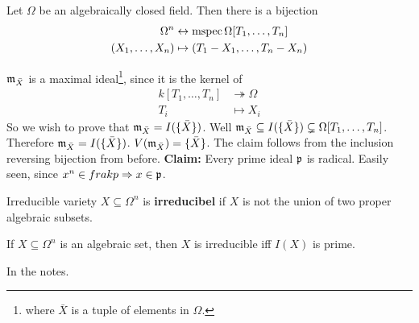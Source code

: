 \documentclass{article}
\begin{document}
\begin{corr}{}
    Let $\Omega$ be an algebraically closed field. Then there is a bijection 
    \begin{align*}
        \Omega^{n} &\leftrightarrow \operatorname{mspec} \Omega[T_{1},\dots,T_{n}]\\
        (X_{1}, \dots, X_{n}) &\mapsto (T_{1}-X_{1}, \dots, T_{n}-X_{n})
    \end{align*}
\end{corr}
\proof $\mathfrak{m}_{\bar X}$ is a maximal ideal\footnote{where $\bar X$ is a tuple of elements in $\Omega$.}, since it is the kernel of \begin{align*}
    k[T_{1}, \dots, T_{n}] &\twoheadrightarrow \Omega\\
    T_{i} &\mapsto X_{i}
\end{align*}
So we wish to prove that $\mathfrak{m}_{\bar X} = I(\{\bar X\})$. Well $\mathfrak{m}_{\bar X} \subseteq I(\{\bar X\}) \subsetneq \Omega[T_{1}, \dots, T_{n}]$. Therefore $\mathfrak{m}_{\bar X} = I(\{ \bar X\})$. $V(\mathfrak{m}_{\bar X}) = \{\bar X\}$. The claim follows from the inclusion reversing bijection from before.\endproof 
\textbf{Claim:} Every prime ideal $\mathfrak{p}$ is radical. Easily seen, since $x^{n} \in frakp \Rightarrow x \in \mathfrak{p}$.
\begin{fancydefine}{Irreducible variety}
    $X \subseteq \Omega^{n}$ is \textbf{irreducibel} if $X$ is not the union of two proper algebraic subsets.
\end{fancydefine}
\begin{fancyprop}{}
    If $X \subseteq \Omega^{n}$ is an algebraic set, then $X$ is irreducible iff $I(X)$ is prime.
\end{fancyprop}
\proof In the notes.
\end{document}
